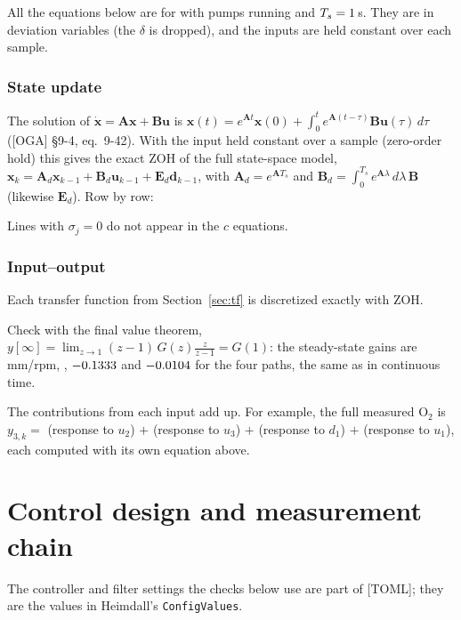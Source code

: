 \documentclass[11pt]{article}
\begin{document}
\begin{center}

\end{center}

All the equations below are for \CASNomMode{} with \CASNomPumps{} pumps running and
$T_s = 1$\,s. They are in deviation variables (the $\delta$ is dropped), and the inputs
are held constant over each sample.

\subsubsection*{State update}
The solution of $\dot{\mathbf x} = \mathbf A\mathbf x + \mathbf B\mathbf u$ is
$\mathbf x(t) = e^{\mathbf A t}\mathbf x(0) + \int_0^t e^{\mathbf A(t-\tau)}\mathbf B\mathbf u(\tau)\,d\tau$
([OGA] §9-4, eq.~9-42). With the input held constant over a sample (zero-order hold) this gives
the exact ZOH of the full state-space model,
$\mathbf x_k = \mathbf A_d\mathbf x_{k-1} + \mathbf B_d\mathbf u_{k-1} + \mathbf E_d\mathbf d_{k-1}$,
with $\mathbf A_d = e^{\mathbf AT_s}$ and $\mathbf B_d = \int_0^{T_s} e^{\mathbf A\lambda}\,d\lambda\,\mathbf B$
(likewise $\mathbf E_d$). Row by row:

Lines with $\sigma_j = 0$ do not appear in the $c$ equations.

\subsubsection*{Input--output}
Each transfer function from Section~\ref{sec:tf} is discretized exactly with ZOH.


Check with the final value theorem, $y[\infty] = \lim_{z\to1}(z-1)\,G(z)\frac{z}{z-1} = G(1)$:
the steady-state gains are \CASGainLevel\,mm/rpm, \CASGainOxy, $-0.1333$ and $-0.0104$ for the four paths,
the same as in continuous time.

The contributions from each input add up. For example, the full measured O$_2$ is
$y_{3,k} = $ (response to $u_2$) $+$ (response to $u_3$) $+$ (response to $d_1$) $+$
(response to $u_1$), each computed with its own equation above.

\section{Control design and measurement chain}\label{sec:control}

The controller and filter settings the checks below use are part of [TOML]; they are the
values in Heimdall's \texttt{ConfigValues}.
\begin{center}

\end{center}
\end{document}
